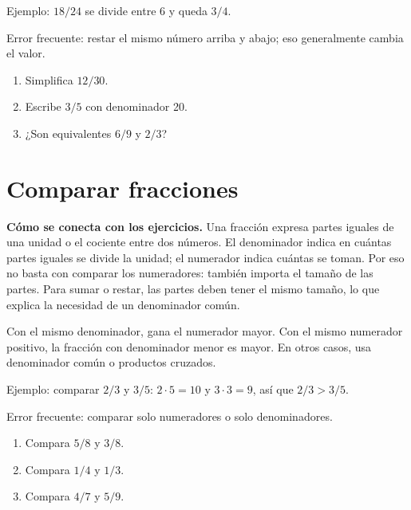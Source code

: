 \documentclass[10pt,oneside,openany]{book}
\begin{document}
\begin{ejemplo}
Ejemplo: $18/24$ se divide entre 6 y queda $3/4$.
\end{ejemplo}

\begin{ojo}
Error frecuente: restar el mismo número arriba y abajo; eso generalmente cambia el valor.
\end{ojo}

\begin{practica}

\begin{enumerate}

\item Simplifica $12/30$.

\item Escribe $3/5$ con denominador 20.

\item ¿Son equivalentes $6/9$ y $2/3$?

\end{enumerate}

\end{practica}



\section{Comparar fracciones}

\textbf{Cómo se conecta con los ejercicios.} Una fracción expresa partes iguales de una unidad o el cociente entre dos números. El denominador indica en cuántas partes iguales se divide la unidad; el numerador indica cuántas se toman. Por eso no basta con comparar los numeradores: también importa el tamaño de las partes. Para sumar o restar, las partes deben tener el mismo tamaño, lo que explica la necesidad de un denominador común.

Con el mismo denominador, gana el numerador mayor. Con el mismo numerador positivo, la fracción con denominador menor es mayor. En otros casos, usa denominador común o productos cruzados.

\begin{ejemplo}
Ejemplo: comparar $2/3$ y $3/5$: $2\cdot5=10$ y $3\cdot3=9$, así que $2/3>3/5$.
\end{ejemplo}

\begin{ojo}
Error frecuente: comparar solo numeradores o solo denominadores.
\end{ojo}

\begin{practica}

\begin{enumerate}

\item Compara $5/8$ y $3/8$.

\item Compara $1/4$ y $1/3$.

\item Compara $4/7$ y $5/9$.

\end{enumerate}

\end{practica}
\end{document}
